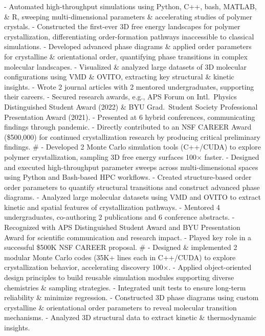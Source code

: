 - Automated high-throughput simulations using Python, C++, bash, MATLAB, \& R, sweeping multi-dimensional parameters \& accelerating studies of polymer crystals.
- Constructed the first-ever 3D free energy landscapes for polymer crystallization, differentiating order-formation pathways inaccessible to classical simulations.%
- Developed advanced phase diagrams \& applied order parameters for crystalline \& orientational order, quantifying phase transitions in complex molecular landscapes.
- Visualized \& analyzed large datasets of 3D molecular configurations using VMD \& OVITO, extracting key structural \& kinetic insights.
- Wrote 2 journal articles with 2 mentored undergraduates, supporting their careers.
- Secured research awards, e.g., APS Forum on Intl.~Physics Distinguished Student Award (2022) \& BYU Grad.~Student Society Professional Presentation Award (2021).
- Presented at 6 hybrid conferences, communicating findings through pandemic.
- Directly contributed to an NSF CAREER Award (\$500,000) for continued crystallization research by producing critical preliminary findings.
#
- Developed 2 Monte Carlo simulation tools (C++/CUDA) to explore polymer crystallization, sampling 3D free energy surfaces 100$\times$ faster.
- Designed and executed high-throughput parameter sweeps across multi-dimensional spaces using Python and Bash-based HPC workflows.
- Created structure-based order order parameters to quantify structural transitions and construct advanced phase diagrams.
- Analyzed large molecular datasets using VMD and OVITO to extract kinetic and spatial features of crystallization pathways.
- Mentored 4 undergraduates, co-authoring 2 publications and 6 conference abstracts.
- Recognized with APS Distinguished Student Award and BYU Presentation Award for scientific communication and research impact.
- Played key role in a successful \$500K NSF CAREER proposal.
#
- Designed \& implemented 2 modular Monte Carlo codes (35K+ lines each in C++/CUDA) to explore crystallization behavior, accelerating discovery 100$\times$.
- Applied object-oriented design principles to build reusable simulation modules supporting diverse chemistries \& sampling strategies.
- Integrated unit tests to ensure long-term reliability \& minimize regression.%
- Constructed 3D phase diagrams using custom crystalline \& orientational order parameters to reveal molecular transition mechanisms.
- Analyzed 3D structural data to extract kinetic \& thermodynamic insights.%
